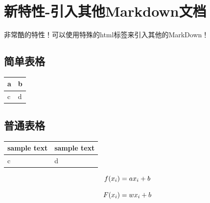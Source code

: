 \documentclass{article}
\newlength\tablewidth
\begin{document}
\section{新特性{-}引入其他Markdown文档}




非常酷的特性！可以使用特殊的html标签来引入其他的MarkDown！


\normalsize



\subsection{简单表格}


\begin{center}
\setlength\tablewidth{\dimexpr (\textwidth -4\tabcolsep)}
\begin{tabular}{|p{0.500\tablewidth}<{\centering}|p{0.500\tablewidth}<{\centering}|}
\hline
\rowcolor{tabletopgray}
\textbf{a}&\textbf{b}\\
\hline
c&d\\
\hline
\end{tabular}
\end{center}



\subsection{普通表格}


\begin{center}
\setlength\tablewidth{\dimexpr (\textwidth -4\tabcolsep)}
\begin{tabular}{|p{0.500\tablewidth}<{\centering}|p{0.500\tablewidth}<{\centering}|}
\hline
\rowcolor{tabletopgray}
\textbf{sample text }&\textbf{ sample text}\\
\hline
c&d\\
\hline
\end{tabular}
\end{center}


\normalsize



\[
f(x_i)=ax_i+b\\
\]



\begin{markquote}
\[
F(x_i) = wx_i+b\\
\]


\end{markquote}
\end{document}

